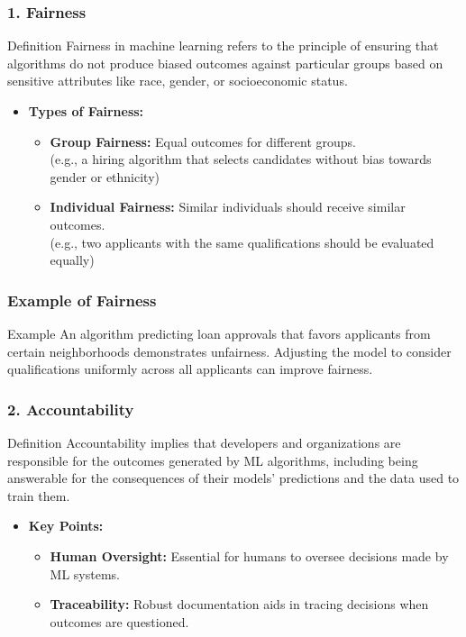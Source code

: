 \documentclass[aspectratio=169]{beamer}
\begin{document}
\begin{frame}[fragile]
    \frametitle{1. Fairness}
    \begin{block}{Definition}
        Fairness in machine learning refers to the principle of ensuring that algorithms do not produce biased outcomes against particular groups based on sensitive attributes like race, gender, or socioeconomic status.
    \end{block}
    \begin{itemize}
        \item \textbf{Types of Fairness:}
        \begin{itemize}
            \item \textbf{Group Fairness:} Equal outcomes for different groups. \\
            (e.g., a hiring algorithm that selects candidates without bias towards gender or ethnicity)
            \item \textbf{Individual Fairness:} Similar individuals should receive similar outcomes. \\
            (e.g., two applicants with the same qualifications should be evaluated equally)
        \end{itemize}
    \end{itemize}
\end{frame}

\begin{frame}[fragile]
    \frametitle{Example of Fairness}
    \begin{block}{Example}
        An algorithm predicting loan approvals that favors applicants from certain neighborhoods demonstrates unfairness. Adjusting the model to consider qualifications uniformly across all applicants can improve fairness.
    \end{block}
\end{frame}

\begin{frame}[fragile]
    \frametitle{2. Accountability}
    \begin{block}{Definition}
        Accountability implies that developers and organizations are responsible for the outcomes generated by ML algorithms, including being answerable for the consequences of their models' predictions and the data used to train them.
    \end{block}
    \begin{itemize}
        \item \textbf{Key Points:}
        \begin{itemize}
            \item \textbf{Human Oversight:} Essential for humans to oversee decisions made by ML systems.
            \item \textbf{Traceability:} Robust documentation aids in tracing decisions when outcomes are questioned.
        \end{itemize}
    \end{itemize}
\end{frame}
\end{document}
